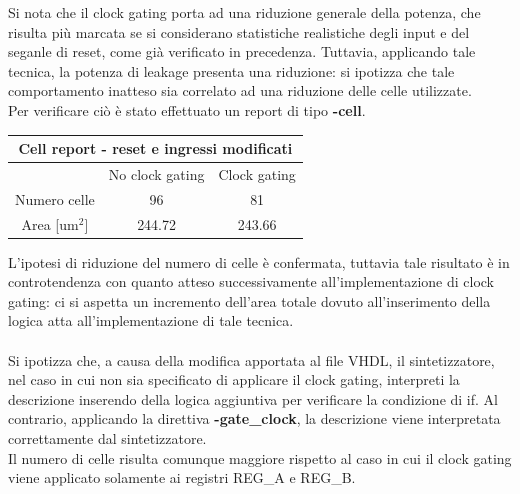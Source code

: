 \documentclass[11pt,  english, makeidx, a4paper, titlepage, oneside]{book}
\begin{document}
\vspace{0.3cm}          
Si nota che il clock gating porta ad una riduzione generale della potenza, che risulta più marcata se si considerano statistiche realistiche degli input e del seganle di reset, come già verificato in precedenza. Tuttavia, applicando tale tecnica, la potenza di leakage presenta una riduzione: si ipotizza che tale comportamento inatteso sia correlato ad una riduzione delle celle utilizzate.
\\
Per verificare ciò è stato effettuato un report di tipo \textbf{-cell}.
\\
\begin{center}
	\begin{tabular}{|c|c|c|}
	\hline
	\multicolumn{3}{|c|}{Cell report - reset e ingressi modificati}\\
	\hline
	& No clock gating & Clock gating \\
	\hline
	Numero celle & 96 & 81 \\
	\hline
	 Area [um$^2$] & 244.72 & 243.66 \\
	\hline
	\end{tabular}	
\end{center}
\vspace{0.3cm} 
 L'ipotesi di riduzione del numero di celle è confermata, tuttavia tale risultato è in controtendenza con quanto atteso successivamente all'implementazione di clock gating: ci si aspetta un incremento dell'area totale dovuto all'inserimento della logica atta all'implementazione di tale tecnica.
 \\\\
Si ipotizza che, a causa della modifica apportata al file VHDL, il sintetizzatore, nel caso in cui non sia specificato di applicare il clock gating, interpreti la descrizione inserendo della logica aggiuntiva per verificare la condizione di if. Al contrario, applicando la direttiva \textbf{-gate\_clock}, la descrizione viene interpretata correttamente dal sintetizzatore.
\\
Il numero di celle risulta comunque maggiore rispetto al caso in cui il clock gating viene applicato solamente ai registri REG\_A e REG\_B.
\\
\end{document}
